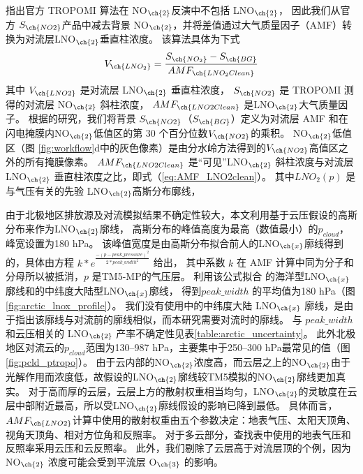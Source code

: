\citet{Zhang.2022a}指出官方 TROPOMI 算法在 NO$_{\ch{2}}$反演中不包括 LNO$_{\ch{2}}$，
因此我们从官方 $S_{\ch{NO2}}$产品中减去背景 NO$_{\ch{2}}$，并将差值通过大气质量因子（AMF）转换为对流层LNO$_{\ch{2}}$垂直柱浓度。
该算法具体为下式
\begin{equation} \label{eq:arctic_LNO2}
V_{\ch{LNO_2}} = \frac{S_{\ch{NO_2}} - S_{\ch{BG}}}{AMF_{\ch{LNO_2Clean}}}
\end{equation}
其中 $V_{\ch{LNO2}}$ 是对流层 LNO$_{\ch{2}}$ 垂直柱浓度，
$S_{\ch{NO2}}$ 是 TROPOMI 测得的对流层 NO$_{\ch{2}}$ 斜柱浓度，
$AMF_{\ch{LNO2Clean}}$ 是LNO$_{\ch{2}}$大气质量因子。
根据\citet{Allen.2021a}的研究，我们将背景 $S_{\ch{NO2}}$（$S_{\ch{BG}}$）定义为对流层 AMF 和在闪电掩膜内NO$_{\ch{2}}$低值区的第 30 个百分位数$V_{\ch{NO2}}$的乘积。
NO$_{\ch{2}}$低值区（图 \ref{fig:workflow}d中的灰色像素）是由分水岭方法得到的$V_{\ch{NO2}}$高值区之外的所有掩膜像素。
$AMF_{\ch{LNO2Clean}}$ 是“可见”LNO$_{\ch{2}}$ 斜柱浓度与对流层 LNO$_{\ch{2}}$ 垂直柱浓度之比，即式（\ref{eq:AMF_LNO2clean}）。
其中$LNO_2(p)$ 是与气压有关的先验 LNO$_{\ch{2}}$高斯分布廓线，

由于北极地区排放源及对流模拟结果不确定性较大，本文利用基于云压假设的高斯分布来作为LNO$_{\ch{2}}$廓线，
高斯分布的峰值高度为最高（数值最小）的$p_{cloud}$，峰宽设置为180 hPa。
该峰值宽度是由高斯分布拟合前人的LNO$_{\ch{x}}$廓线得到的，具体由方程 $k*e^\frac{{-{(p - peak\_pressure)}^2}}{2*peak\_width^{2}}$ 给出，
其中系数 $k$ 在 AMF 计算中同为分子和分母所以被抵消，$p$ 是TM5-MP的气压层。
利用该公式拟合 \citet{Ott.2010} 的海洋型LNO$_{\ch{x}}$廓线和\citet{Luo.2017}的中纬度大陆型LNO$_{\ch{x}}$廓线，
得到$peak\_width$ 的平均值为180 hPa（图\ref{fig:arctic_lnox_profile}）。
我们没有使用\citet{Ott.2010}中的中纬度大陆 LNO$_{\ch{x}}$ 廓线，是由于\citet{Luo.2017}指出该廓线与对流前的廓线相似，而本研究需要对流时的廓线。
与 $peak\_width$ 和云压相关的 LNO$_{\ch{2}}$ 产率不确定性见表\ref{table:arctic_uncertainty}。
此外北极地区对流云的$p_{cloud}$范围为130--987 hPa，主要集中于250--300 hPa最常见的值（图\ref{fig:pcld_ptropo}）。
由于云内部的NO$_{\ch{2}}$浓度高，而云层之上的NO$_{\ch{2}}$由于光解作用而浓度低，故假设的LNO$_{\ch{2}}$廓线较TM5模拟的NO$_{\ch{2}}$廓线更加真实\citep{Beirle.2009}。
对于高而厚的云层，云层上方的散射权重相当均匀，LNO$_{\ch{2}}$的灵敏度在云层中部附近最高，所以受LNO$_{\ch{2}}$廓线假设的影响已降到最低\citep{Laughner.2017}。
具体而言，$AMF_{\ch{LNO2}}$计算中使用的散射权重由五个参数决定：地表气压、太阳天顶角、视角天顶角、相对方位角和反照率。
对于多云部分，查找表中使用的地表气压和反照率采用云压和云反照率。
此外，我们剔除了云层高于对流层顶的个例，因为 NO$_{\ch{2}}$ 浓度可能会受到平流层 O$_{\ch{3}}$ 的影响\citep{Frey.2015a,Zhang.2022a}。


